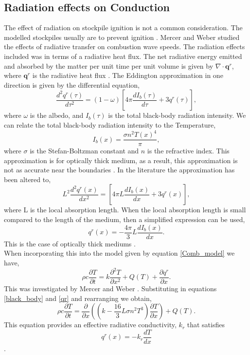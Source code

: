 \subsection{Radiation effects on Conduction}
The effect of radiation on stockpile ignition is not a common consideration. The modelled stockpiles usually are to prevent ignition \cite{Zhang16}. Mercer and Weber \cite{mercer97} studied the effects of radiative transfer on combustion wave speeds. The radiation effects included was in terms of a radiative heat flux. The net radiative energy emitted and absorbed by the matter per unit time per unit volume is given by $ \nabla \cdot \mathbf{q}^r$, where $\mathbf{q}^r$ is the radiative heat flux  \cite{ozisik73}. The Eddington approximation in one direction is given by the differential equation,
\begin{equation}
\frac{d^2 q^r(\tau)}{d\tau^2}=(1-\omega)\left[4\pi\frac{dI_b(\tau)}{d\tau}+3q^r(\tau)\right],
\end{equation}
where $\omega$ is the albedo, and $I_b(\tau)$ is the total black-body radiation intensity. We can relate the total black-body radiation intensity to the Temperature, 
\begin{equation}
I_b(x)=\frac{\sigma n^2 T(x)^4}{\pi}, \label{black_body}
\end{equation}
where $\sigma$ is the Stefan-Boltzman constant and $n$ is the refractive index. This approximation is for optically thick medium, as a result, this approximation is not as accurate near the boundaries \cite{ozisik73}. In the literature \cite{joulin86,mercer97} the approximation has been altered to,
\begin{equation}
L^2\frac{d^2 q^r(x)}{dx^2}=\left[4\pi L\frac{dI_b(x)}{dx}+3q^r(x)\right],
\end{equation}   
where L is the local absorption length. When the local absorption length is small compared to the length of the medium, then a simplified expression can be used,
\begin{equation}
q^r(x)=-\frac{4\pi}{3} L\frac{dI_b(x)}{dx}.	\label{qr}
\end{equation}
This is the case of optically thick mediums \cite{mercer97}.\\

When incorporating this into the model given by equation \ref{Comb_model} we have, 
\begin{equation}
\rho c\frac{\partial T}{\partial t}=k\frac{\partial^2 T}{\partial x^2}+Q(T)+\frac{\partial q^r}{\partial x}. \label{Rad_model}
\end{equation}
This was investigated by Mercer and Weber \cite{mercer97}. Substituting in equations \ref{black_body} and \ref{qr} and rearranging we obtain,
\begin{equation}
\rho c\frac{\partial T}{\partial t}=\frac{\partial}{\partial x}\left(\left(k-\frac{16}{3} L \sigma n^2 T^3\right)\frac{\partial T}{\partial x}\right) +Q(T).
\end{equation}
This equation provides an effective radiative conductivity, $k_r$ that satisfies $$q^r(x)=-k_r \frac{dT}{dx}$$.

